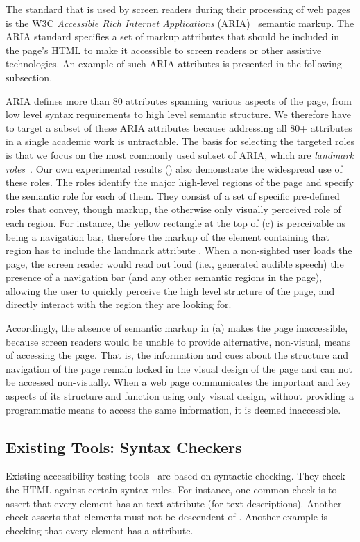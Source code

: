 The standard that is used by screen readers during their processing of 
web pages is the W3C \emph{Accessible Rich Internet Applications} 
(ARIA)~\cite{ARIA} semantic markup.
The ARIA standard specifies a set of markup attributes that 
should be included in the page's HTML to make it accessible to screen readers 
or other assistive technologies. An example of such ARIA attributes is presented in the following subsection. 

\label{header:targeted-roles}
ARIA defines more than 80 attributes spanning various aspects of the page, 
from low level syntax requirements to high level semantic structure. 
We therefore have to target a subset of these ARIA attributes because 
addressing all 80+ attributes in a single academic work is untractable. 
The basis for selecting the targeted roles is that we focus on the most 
commonly used subset of ARIA, which are \emph{landmark roles}~\cite{2019users_survey}.  
Our own experimental results () also demonstrate the 
widespread use of these roles.
The roles identify the major high-level regions of the page and 
specify the semantic role for each of them.  
They consist of a set of specific pre-defined roles that convey, 
though markup, the otherwise only visually perceived role of each region.
For instance, the yellow rectangle at the top of (c) 
is perceivable as being a navigation bar, 
therefore the markup of the element containing that region has 
to include the landmark attribute . 
When a non-sighted user loads the page, the screen reader would read out loud (i.e., generated audible speech) the presence of a navigation bar (and any other semantic regions in the page), allowing the user to quickly perceive the high level structure of the page, and directly interact with the region they are looking for.

Accordingly, the absence of semantic markup in (a) 
makes the page inaccessible, because screen readers would be unable to 
provide alternative, non-visual, means of accessing the page.  
That is, the information and cues about the
structure and navigation of the page remain locked 
in the visual design of the page and can not be 
accessed non-visually.
When a web page communicates the important and key aspects of its structure and function using only visual design, without providing a programmatic means to access the same information, it is deemed inaccessible.

\subsection{Existing Tools: Syntax  Checkers}\label{subsec:syncheckers}
Existing accessibility testing tools~\cite{ukgov:audit:2018} are 
based on syntactic checking. 
They check the HTML against certain syntax rules. 
For instance, one common check is to assert that every  element 
has an  text attribute (for text descriptions). 
Another check asserts that  elements must not 
be descendent of .
Another example is checking that every  
element has a  attribute.  
 
